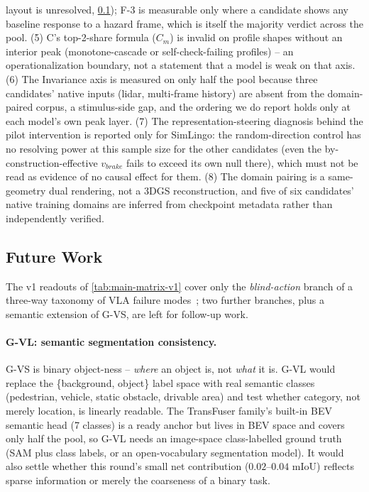 layout is unresolved, \cref{sec:future}); F-3 is measurable only where a candidate shows
any baseline response to a hazard frame, which is itself the majority verdict across the
pool. (5) C's top-2-share formula ($C_m$) is invalid on profile shapes without an
interior peak (monotone-cascade or self-check-failing profiles) -- an operationalization
boundary, not a statement that a model is weak on that axis. (6) The Invariance axis is
measured on only half the pool because three candidates' native inputs (lidar,
multi-frame history) are absent from the domain-paired corpus, a stimulus-side gap, and
the ordering we do report holds only at each model's own peak layer. (7) The
representation-steering diagnosis behind the pilot intervention is reported only for
SimLingo: the random-direction control has no resolving power at this sample size for the
other candidates (even the by-construction-effective $v_{brake}$ fails to exceed its own
null there), which must not be read as evidence of no causal effect for them. (8) The
domain pairing is a same-geometry dual rendering, not a 3DGS reconstruction, and five of
six candidates' native training domains are inferred from checkpoint metadata rather than
independently verified.

\subsection{Future Work}
\label{sec:future}

The v1 readouts of \cref{tab:main-matrix-v1} cover only the \emph{blind-action} branch of
a three-way taxonomy of VLA failure modes~\cite{embodiedinterp2026}; two further branches,
plus a semantic extension of G-VS, are left for follow-up work.

\paragraph{G-VL: semantic segmentation consistency.} G-VS is binary object-ness --
\emph{where} an object is, not \emph{what} it is. G-VL would replace the
\{background, object\} label space with real semantic classes (pedestrian, vehicle,
static obstacle, drivable area) and test whether category, not merely location, is
linearly readable. The TransFuser family's built-in BEV semantic head (7 classes) is a
ready anchor but lives in BEV space and covers only half the pool, so G-VL needs an
image-space class-labelled ground truth (SAM plus class labels, or an open-vocabulary
segmentation model). It would also settle whether this round's small net contribution
($0.02$--$0.04$ mIoU) reflects sparse information or merely the coarseness of a binary
task.

